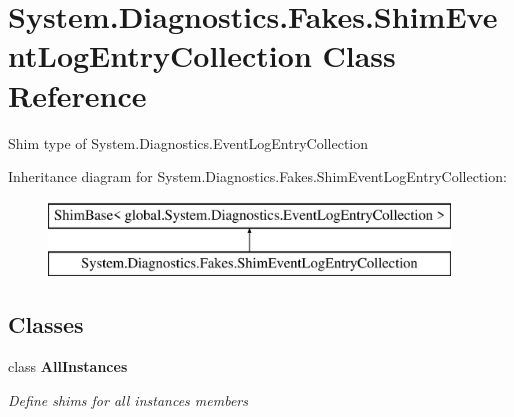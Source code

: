 \hypertarget{class_system_1_1_diagnostics_1_1_fakes_1_1_shim_event_log_entry_collection}{\section{System.\-Diagnostics.\-Fakes.\-Shim\-Event\-Log\-Entry\-Collection Class Reference}
\label{class_system_1_1_diagnostics_1_1_fakes_1_1_shim_event_log_entry_collection}
}


Shim type of System.\-Diagnostics.\-Event\-Log\-Entry\-Collection 


Inheritance diagram for System.\-Diagnostics.\-Fakes.\-Shim\-Event\-Log\-Entry\-Collection\-:\begin{figure}[H]
\begin{center}
\leavevmode
\includegraphics[height=2.000000cm]{class_system_1_1_diagnostics_1_1_fakes_1_1_shim_event_log_entry_collection}
\end{center}
\end{figure}
\subsection*{Classes}
\begin{DoxyCompactItemize}
\item 
class {\bfseries All\-Instances}
\begin{DoxyCompactList}\small\item\em Define shims for all instances members\end{DoxyCompactList}\end{DoxyCompactItemize}
